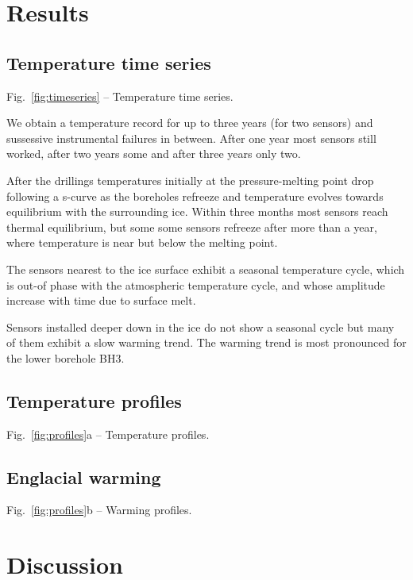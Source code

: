\documentclass[utf8]{article}
\begin{document}
\section{Results}

\subsection{Temperature time series}

    Fig.~\ref{fig:timeseries} -- Temperature time series.

    We obtain a temperature record for up to three years (for two sensors) and
    sussessive instrumental failures in between. After one year most sensors
    still worked, after two years some and after three years only two.

    After the drillings temperatures initially at the pressure-melting point
    drop following a s-curve as the boreholes refreeze and temperature evolves
    towards equilibrium with the surrounding ice. Within three months most
    sensors reach thermal equilibrium, but some some sensors refreeze after
    more than a year, where temperature is near but below the melting point.

    The sensors nearest to the ice surface exhibit a seasonal temperature
    cycle, which is out-of phase with the atmospheric temperature cycle, and
    whose amplitude increase with time due to surface melt.

    Sensors installed deeper down in the ice do not show a seasonal cycle but
    many of them exhibit a slow warming trend. The warming trend is most
    pronounced for the lower borehole BH3.


\subsection{Temperature profiles}
    Fig.~\ref{fig:profiles}a -- Temperature profiles.

\subsection{Englacial warming}
    Fig.~\ref{fig:profiles}b -- Warming profiles.


\section{Discussion}
\end{document}

